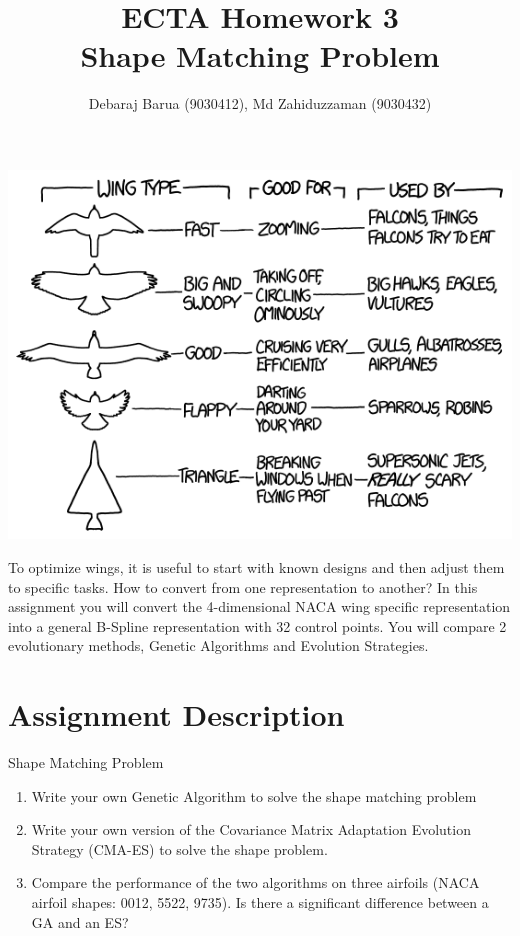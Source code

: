 \documentclass{article}
\title{ECTA Homework 3\\Shape Matching Problem}
\author{Debaraj Barua (9030412), Md Zahiduzzaman (9030432)}
\begin{document}
\maketitle
\begin{center}
	\begin{minipage}{1\linewidth}
		\centering
			\includegraphics[scale=0.6]{img/wingtypes.png}
	\end{minipage}
\end{center}

To optimize wings, it is useful to start with known designs and then adjust them to specific tasks. How to convert from one representation to another? In this assignment you will convert the 4-dimensional NACA wing specific representation into a general B-Spline representation with 32 control points. You will compare 2 evolutionary methods, Genetic Algorithms and Evolution Strategies.

\newpage

\section{Assignment Description}
	Shape Matching Problem
	\begin{enumerate}
		\item Write your own Genetic Algorithm to solve the shape matching problem
		\item Write your own version of the Covariance Matrix Adaptation Evolution Strategy (CMA-ES) to solve the shape problem.
		\item Compare the performance of the two algorithms on three airfoils (NACA airfoil shapes: 0012, 5522, 9735). Is there a significant difference between a GA and an ES? 
	\end{enumerate}
\end{document}
